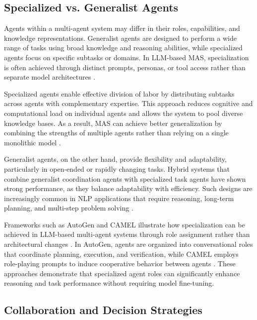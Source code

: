 \subsection{Specialized vs. Generalist Agents}

Agents within a multi-agent system may differ in their roles, capabilities, and knowledge representations. Generalist agents are designed to perform a wide range of tasks using broad knowledge and reasoning abilities, while specialized agents focus on specific subtasks or domains. In LLM-based MAS, specialization is often achieved through distinct prompts, personas, or tool access rather than separate model architectures \cite{tran2025multiagentcollaborationmechanismssurvey}.

Specialized agents enable effective division of labor by distributing subtasks across agents with complementary expertise. This approach reduces cognitive and computational load on individual agents and allows the system to pool diverse knowledge bases. As a result, MAS can achieve better generalization by combining the strengths of multiple agents rather than relying on a single monolithic model \cite{8352646}.

Generalist agents, on the other hand, provide flexibility and adaptability, particularly in open-ended or rapidly changing tasks. Hybrid systems that combine generalist coordination agents with specialized task agents have shown strong performance, as they balance adaptability with efficiency. Such designs are increasingly common in NLP applications that require reasoning, long-term planning, and multi-step problem solving \cite{8352646}.

Frameworks such as AutoGen and CAMEL illustrate how specialization can be achieved in LLM-based multi-agent systems through role assignment rather than architectural changes \cite{wang2025rethinkingmultiagentintelligencelens}. In AutoGen, agents are organized into conversational roles that coordinate planning, execution, and verification, while CAMEL employs role-playing prompts to induce cooperative behavior between agents \cite{wu2023autogenenablingnextgenllm, li2023camelcommunicativeagentsmind}. These approaches demonstrate that specialized agent roles can significantly enhance reasoning and task performance without requiring model fine-tuning.

\subsection{Collaboration and Decision Strategies}

